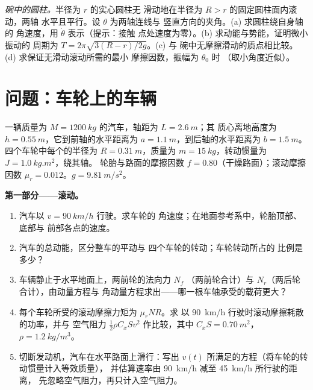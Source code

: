 \begin{exercise}[$\star\star\star$]\label{exo:b2:rigid-body-mechanics:12}
\emph{碗中的圆柱。}半径为 $r$ 的实心圆柱无
滑动地在半径为 $R > r$ 的固定圆柱面内滚动，两轴
水平且平行。设 $\theta$ 为两轴连线与
竖直方向的夹角。(a) 求圆柱绕自身轴的
角速度，用 $\dot\theta$ 表示（提示：接触
点处速度为零）。(b) 求动能与势能，证明微小振动的
周期为 $T = 2\pi\sqrt{3(R - r)/2g}$。(c) 与
碗中无摩擦滑动的质点相比较。(d) 求保证无滑动滚动所需的最小
摩擦因数，振幅为 $\theta_0$ 时
（取小角度近似）。
\end{exercise}

\section{问题：车轮上的车辆}

\begin{problem}
\label{pb:b2:rigid-body-mechanics:1}

一辆质量为 $M = \qty{1200}{kg}$ 的汽车，轴距为 $L = \qty{2.6}{m}$；其
质心离地高度为 $h = \qty{0.55}{m}$，它到前轴的水平距离为
$a = \qty{1.1}{m}$，到后轴的水平距离为 $b = \qty{1.5}{m}$。
四个车轮中每个的半径为 $R = \qty{0.31}{m}$，质量为 $m =
\qty{15}{kg}$，转动惯量为 $J = \qty{1.0}{kg.m^2}$，绕其轴。
轮胎与路面的摩擦因数 $f = 0.80$（干燥路面）；滚动摩擦
因数 $\mu_r = 0.012$。$g = \qty{9.81}{m/s^2}$。

\medskip
\noindent\textbf{第一部分——滚动。}
\begin{enumerate}
  \item 汽车以 $v = \qty{90}{km/h}$ 行驶。求车轮的
        角速度；在地面参考系中，轮胎顶部、底部与
        前部各点的速度。
  \item 汽车的总动能，区分整车的平动与
        四个车轮的转动；车轮转动所占的
        比例是多少？
  \item 车辆静止于水平地面上，两前轮的法向力 $N_f$
        （两前轮合计）与 $N_r$（两后轮合计），由动量方程与
        角动量方程求出——哪一根车轴承受的载荷更大？
  \item 每个车轮所受的滚动摩擦力矩为 $\mu_rNR$。求
        以 \qty{90}{km/h} 行驶时滚动摩擦耗散的功率，并与
        空气阻力 $\tfrac12\rho C_xSv^2$ 作比较，其中 $C_xS =
        \qty{0.70}{m^2}$，$\rho = \qty{1.2}{kg/m^3}$。
  \item 切断发动机，汽车在水平路面上滑行：写出
        $v(t)$ 所满足的方程（将车轮的转动惯量计入等效质量），
        并估算速率由 \qty{90}{km/h} 减至 \qty{45}{km/h} 所行驶的距离，
        先忽略空气阻力，再只计入空气阻力。
\end{enumerate}


\end{problem}
